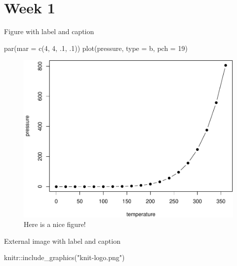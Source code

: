 \documentclass[
]{book}
\newenvironment{Shaded}{\begin{snugshade}}{\end{snugshade}}
\newcommand{\AttributeTok}[1]{\textcolor[rgb]{0.77,0.63,0.00}{#1}}
\newcommand{\DecValTok}[1]{\textcolor[rgb]{0.00,0.00,0.81}{#1}}
\newcommand{\FunctionTok}[1]{\textcolor[rgb]{0.00,0.00,0.00}{#1}}
\newcommand{\NormalTok}[1]{#1}
\newcommand{\SpecialCharTok}[1]{\textcolor[rgb]{0.00,0.00,0.00}{#1}}
\newcommand{\StringTok}[1]{\textcolor[rgb]{0.31,0.60,0.02}{#1}}
\begin{document}
\hypertarget{week-1}{%
\chapter*{Week 1}\label{week-1}}

Figure with label and caption

\begin{Shaded}
\begin{Highlighting}[]
\FunctionTok{par}\NormalTok{(}\AttributeTok{mar =} \FunctionTok{c}\NormalTok{(}\DecValTok{4}\NormalTok{, }\DecValTok{4}\NormalTok{, .}\DecValTok{1}\NormalTok{, .}\DecValTok{1}\NormalTok{))}
\FunctionTok{plot}\NormalTok{(pressure, }\AttributeTok{type =} \StringTok{\textquotesingle{}b\textquotesingle{}}\NormalTok{, }\AttributeTok{pch =} \DecValTok{19}\NormalTok{)}
\end{Highlighting}
\end{Shaded}

\begin{figure}

{\centering \includegraphics[width=0.8\linewidth]{01_Week_1_files/figure-latex/nice-fig-1} 

}

\caption{Here is a nice figure!}\label{fig:nice-fig}
\end{figure}

External image with label and caption

\begin{Shaded}
\begin{Highlighting}[]
\NormalTok{knitr}\SpecialCharTok{::}\FunctionTok{include\_graphics}\NormalTok{(}\StringTok{"knit{-}logo.png"}\NormalTok{)}
\end{Highlighting}
\end{Shaded}
\end{document}
